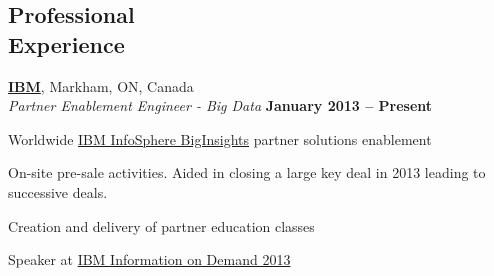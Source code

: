 \documentclass[margin,line]{resume}
\begin{document}
\begin{resume}
\section{\mysidestyle Professional\\Experience}

	\textbf{\href{http://www.ibm.com/}{IBM}}, Markham, ON, Canada					\vspace{2mm}\\\vspace{1mm}
	\textsl{Partner Enablement Engineer - Big Data}	\hfill\textbf{January 2013 -- Present}		\\\vspace{-3mm}
	\begin{list2}
		\item Worldwide \href{http://www.ibm.com/software/data/infosphere/biginsights}{IBM InfoSphere BigInsights} partner solutions enablement
		\item On-site pre-sale activities. Aided in closing a large key deal in 2013 leading to successive deals.
		\item Creation and delivery of partner education classes
		\item Speaker at \href{https://www-01.ibm.com/software/data/2013-conference/}{IBM Information on Demand 2013}
	\end{list2}


\end{resume}
\end{document}
